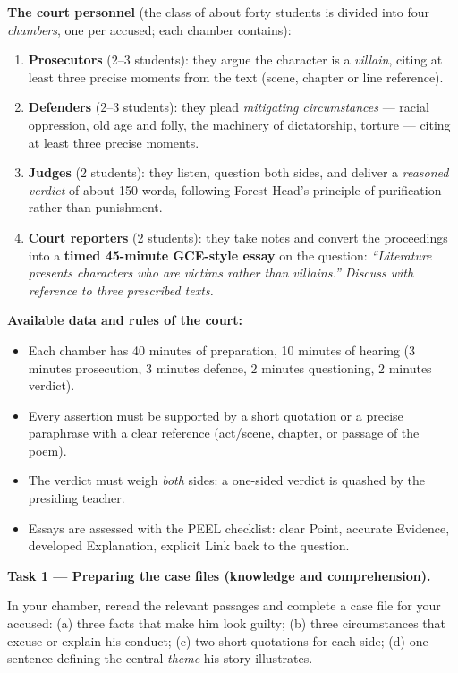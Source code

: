 \documentclass[11pt]{article}
\newcommand{\cle}[1]{{\popxbold\color{popdark}#1}}
\newcounter{popsec}
\newcounter{popsub}
\newcommand{\courssub}[1]{%
  \stepcounter{popsub}%
  \par\vspace{9pt}\noindent{\popxbold\fontsize{11.5}{13}\selectfont\color{popink}{\color{poporange}\thepopsec.\thepopsub}\hspace{6pt}#1}\par\nopagebreak\vspace{4pt}
}
\begin{document}
\textbf{The court personnel} (the class of about forty students is divided into four \emph{chambers}, one per accused; each chamber contains):

\begin{enumerate}
\item \textbf{Prosecutors} (2--3 students): they argue the character is a \emph{villain}, citing at least three precise moments from the text (scene, chapter or line reference).
\item \textbf{Defenders} (2--3 students): they plead \emph{mitigating circumstances} — racial oppression, old age and folly, the machinery of dictatorship, torture — citing at least three precise moments.
\item \textbf{Judges} (2 students): they listen, question both sides, and deliver a \emph{reasoned verdict} of about 150 words, following Forest Head's principle of purification rather than punishment.
\item \textbf{Court reporters} (2 students): they take notes and convert the proceedings into a \textbf{timed 45-minute GCE-style essay} on the question: \emph{``Literature presents characters who are victims rather than villains.'' Discuss with reference to three prescribed texts.}
\end{enumerate}

\textbf{Available data and rules of the court:}
\begin{itemize}
\item Each chamber has 40 minutes of preparation, 10 minutes of hearing (3 minutes prosecution, 3 minutes defence, 2 minutes questioning, 2 minutes verdict).
\item Every assertion must be supported by a \cle{short quotation} or a precise paraphrase with a clear reference (act/scene, chapter, or passage of the poem).
\item The verdict must weigh \emph{both} sides: a one-sided verdict is quashed by the presiding teacher.
\item Essays are assessed with the PEEL checklist: clear Point, accurate Evidence, developed Explanation, explicit Link back to the question.
\end{itemize}

\courssub{Tasks}

\textbf{Task 1 — Preparing the case files (knowledge and comprehension).}\par
In your chamber, reread the relevant passages and complete a case file for your accused: (a) three facts that make him look guilty; (b) three circumstances that excuse or explain his conduct; (c) two short quotations for each side; (d) one sentence defining the central \emph{theme} his story illustrates.
\end{document}
